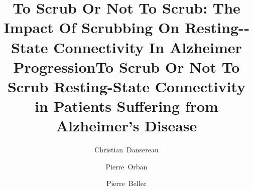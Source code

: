 \documentclass[authoryear]{elsarticle}
\begin{document}
\begin{frontmatter}
\title{To Scrub Or Not To Scrub: The Impact Of Scrubbing On Resting-­State Connectivity In Alzheimer Progression}
\title{To Scrub Or Not To Scrub Resting-State Connectivity in Patients Suffering from Alzheimer's Disease}

\author[a,b]{Christian~Dansereau}
\author[a]{Pierre~Orban}
\author[a,b]{Pierre~Bellec}
\address[a]{Centre de Recherche de l'Institut Universitaire de G\'eriatrie de Montr\'eal, Montr\'eal, CA}
\address[b]{D\'epartement d'Informatique et de recherche op\'erationnelle, Universit\'e de Montr\'eal, Montr\'eal,
CA}



\end{frontmatter}
\end{document}

